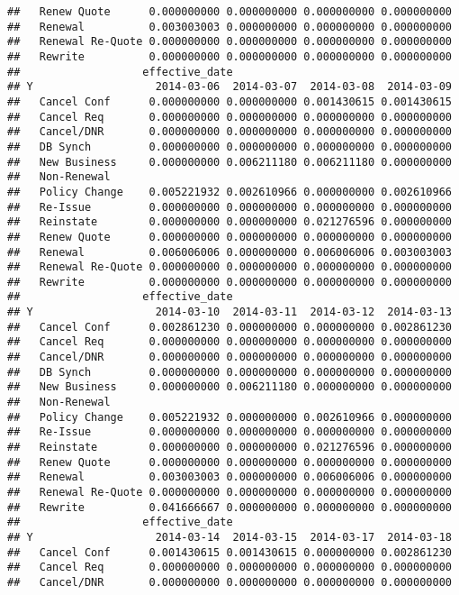 \documentclass[]{article}
\begin{document}
\begin{verbatim}
##   Renew Quote      0.000000000 0.000000000 0.000000000 0.000000000
##   Renewal          0.003003003 0.000000000 0.000000000 0.000000000
##   Renewal Re-Quote 0.000000000 0.000000000 0.000000000 0.000000000
##   Rewrite          0.000000000 0.000000000 0.000000000 0.000000000
##                   effective_date
## Y                   2014-03-06  2014-03-07  2014-03-08  2014-03-09
##   Cancel Conf      0.000000000 0.000000000 0.001430615 0.001430615
##   Cancel Req       0.000000000 0.000000000 0.000000000 0.000000000
##   Cancel/DNR       0.000000000 0.000000000 0.000000000 0.000000000
##   DB Synch         0.000000000 0.000000000 0.000000000 0.000000000
##   New Business     0.000000000 0.006211180 0.006211180 0.000000000
##   Non-Renewal                                                     
##   Policy Change    0.005221932 0.002610966 0.000000000 0.002610966
##   Re-Issue         0.000000000 0.000000000 0.000000000 0.000000000
##   Reinstate        0.000000000 0.000000000 0.021276596 0.000000000
##   Renew Quote      0.000000000 0.000000000 0.000000000 0.000000000
##   Renewal          0.006006006 0.000000000 0.006006006 0.003003003
##   Renewal Re-Quote 0.000000000 0.000000000 0.000000000 0.000000000
##   Rewrite          0.000000000 0.000000000 0.000000000 0.000000000
##                   effective_date
## Y                   2014-03-10  2014-03-11  2014-03-12  2014-03-13
##   Cancel Conf      0.002861230 0.000000000 0.000000000 0.002861230
##   Cancel Req       0.000000000 0.000000000 0.000000000 0.000000000
##   Cancel/DNR       0.000000000 0.000000000 0.000000000 0.000000000
##   DB Synch         0.000000000 0.000000000 0.000000000 0.000000000
##   New Business     0.000000000 0.006211180 0.000000000 0.000000000
##   Non-Renewal                                                     
##   Policy Change    0.005221932 0.000000000 0.002610966 0.000000000
##   Re-Issue         0.000000000 0.000000000 0.000000000 0.000000000
##   Reinstate        0.000000000 0.000000000 0.021276596 0.000000000
##   Renew Quote      0.000000000 0.000000000 0.000000000 0.000000000
##   Renewal          0.003003003 0.000000000 0.006006006 0.000000000
##   Renewal Re-Quote 0.000000000 0.000000000 0.000000000 0.000000000
##   Rewrite          0.041666667 0.000000000 0.000000000 0.000000000
##                   effective_date
## Y                   2014-03-14  2014-03-15  2014-03-17  2014-03-18
##   Cancel Conf      0.001430615 0.001430615 0.000000000 0.002861230
##   Cancel Req       0.000000000 0.000000000 0.000000000 0.000000000
##   Cancel/DNR       0.000000000 0.000000000 0.000000000 0.000000000

\end{verbatim}
\end{document}
